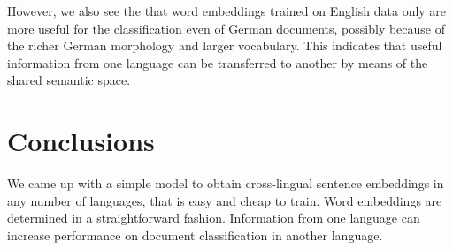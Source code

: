 \documentclass[a4paper,11pt]{article}
\begin{document}
However, we also see the that word embeddings trained on English data only are more useful for the classification even of German documents, possibly because of the richer German morphology and larger vocabulary. This indicates that useful information from one language can be transferred to another by means of the shared semantic space.









\section*{Conclusions}


We came up with a simple model to obtain cross-lingual sentence embeddings in any number of languages, that is easy and cheap to train. Word embeddings are determined in a straightforward fashion. Information from one language can increase performance on document classification in another language. 













\end{document}
